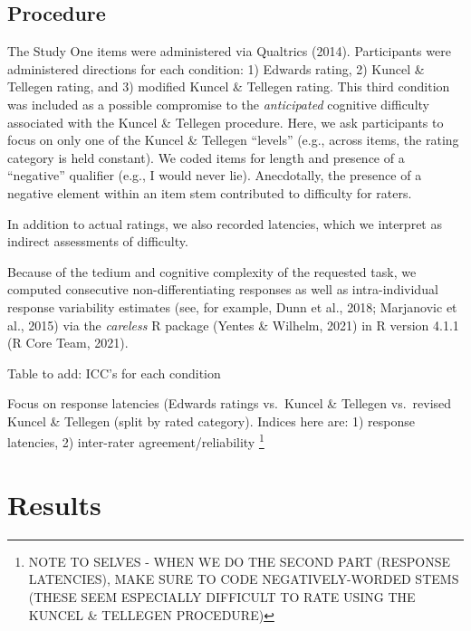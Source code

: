 \documentclass[
  ,jou]{apa6}
\begin{document}
\hypertarget{procedure-1}{%
\subsection{Procedure}\label{procedure-1}}

The Study One items were administered via Qualtrics (2014). Participants were administered directions for each condition: 1) Edwards rating, 2) Kuncel \& Tellegen rating, and 3) modified Kuncel \& Tellegen rating. This third condition was included as a possible compromise to the \emph{anticipated} cognitive difficulty associated with the Kuncel \& Tellegen procedure. Here, we ask participants to focus on only one of the Kuncel \& Tellegen ``levels'' (e.g., across items, the rating category is held constant). We coded items for length and presence of a ``negative'' qualifier (e.g., I would never lie). Anecdotally, the presence of a negative element within an item stem contributed to difficulty for raters.

In addition to actual ratings, we also recorded latencies, which we interpret as indirect assessments of difficulty.

Because of the tedium and cognitive complexity of the requested task, we computed consecutive non-differentiating responses as well as intra-individual response variability estimates (see, for example, Dunn et al., 2018; Marjanovic et al., 2015) via the \emph{careless} R package (Yentes \& Wilhelm, 2021) in R version 4.1.1 (R Core Team, 2021).

Table to add: ICC's for each condition

Focus on response latencies (Edwards ratings vs.~Kuncel \& Tellegen vs.~revised Kuncel \& Tellegen (split by rated category). Indices here are: 1) response latencies, 2) inter-rater agreement/reliability \footnote{NOTE TO SELVES - WHEN WE DO THE SECOND PART (RESPONSE LATENCIES), MAKE SURE TO CODE NEGATIVELY-WORDED STEMS (THESE SEEM ESPECIALLY DIFFICULT TO RATE USING THE KUNCEL \& TELLEGEN PROCEDURE)}

\hypertarget{results-2}{%
\section{Results}\label{results-2}}
\end{document}
